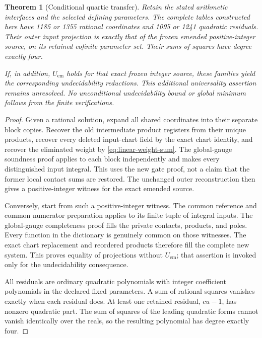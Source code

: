 \documentclass[11pt]{article}
\newtheorem{theorem}{Theorem}
\begin{document}
\begin{theorem}[Conditional quartic transfer]
Retain the stated arithmetic interfaces and the selected defining
parameters. The complete tables constructed here have 1185 or 1355
rational coordinates and 1095 or 1241 quadratic residuals. Their
outer input projection is exactly that of the frozen emended
positive-integer source, on its retained cofinite parameter set.
Their sums of squares have degree exactly four.

If, in addition, \(U_{\mathrm{em}}\) holds for that exact frozen
integer source, these families yield the corresponding undecidability
reductions. This additional universality assertion remains unresolved.
No unconditional undecidability bound or global minimum follows from
the finite verifications.
\end{theorem}
\begin{proof}
Given a rational solution, expand all shared coordinates into their
separate block copies. Recover the old intermediate product registers
from their unique products, recover every deleted input-chart field
by the exact chart identity, and recover the eliminated weight by
\eqref{eq:linear-weight-sum}. The global-gauge soundness proof applies
to each block independently and makes every distinguished input
integral. This uses the new gate proof, not a claim that the former
local contact sums are restored. The unchanged outer reconstruction
then gives a positive-integer witness for the exact emended source.

Conversely, start from such a positive-integer witness. The common
reference and common numerator preparation applies to its finite
tuple of integral inputs. The global-gauge completeness proof fills
the private contacts, products, and poles. Every function in the
dictionary is genuinely common on those witnesses. The exact chart
replacement and reordered products therefore fill the complete new
system. This proves equality of projections without
\(U_{\mathrm{em}}\); that assertion is invoked only for the
undecidability consequence.

All residuals are ordinary quadratic polynomials with integer
coefficient polynomials in the declared fixed parameters. A sum of
rational squares vanishes exactly when each residual does. At least
one retained residual, \(cu-1\), has nonzero quadratic part. The sum
of squares of the leading quadratic forms cannot vanish identically
over the reals, so the resulting polynomial has degree exactly four.
\end{proof}
\end{document}
